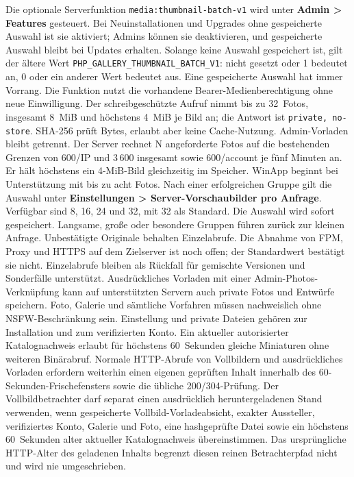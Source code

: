 \documentclass[11pt,a4paper]{article}
\newcommand{\ui}[1]{\textbf{#1}}
\newcommand{\codeword}[1]{\nolinkurl{#1}}
\begin{document}
Die optionale Serverfunktion \codeword{media:thumbnail-batch-v1} wird unter
\ui{Admin > Features} gesteuert. Bei Neuinstallationen und Upgrades ohne
gespeicherte Auswahl ist sie aktiviert; Admins können sie deaktivieren, und
gespeicherte Auswahl bleibt bei Updates erhalten. Solange keine Auswahl
gespeichert ist, gilt der ältere Wert
\codeword{PHP_GALLERY_THUMBNAIL_BATCH_V1}: nicht gesetzt oder 1 bedeutet an,
0 oder ein anderer Wert bedeutet aus. Eine gespeicherte Auswahl hat immer
Vorrang. Die Funktion nutzt die vorhandene
Bearer-Medienberechtigung ohne neue Einwilligung. Der schreibgeschützte Aufruf
nimmt bis zu 32~Fotos, insgesamt 8~MiB und höchstens 4~MiB je Bild an; die
Antwort ist \texttt{private, no-store}. SHA-256 prüft Bytes, erlaubt aber keine
Cache-Nutzung. Admin-Vorladen bleibt getrennt. Der Server rechnet N angeforderte
Fotos auf die bestehenden Grenzen von 600/IP und 3\,600 insgesamt sowie
600/account je fünf Minuten an. Er hält höchstens ein 4-MiB-Bild gleichzeitig
im Speicher. WinApp beginnt bei Unterstützung mit bis zu acht Fotos. Nach
einer erfolgreichen Gruppe gilt die Auswahl unter
\ui{Einstellungen > Server-Vorschaubilder pro Anfrage}. Verfügbar sind 8, 16,
24 und 32, mit 32 als Standard. Die Auswahl wird sofort gespeichert.
Langsame, große oder besondere Gruppen führen zurück zur kleinen Anfrage.
Unbestätigte Originale behalten Einzelabrufe.
Die Abnahme von FPM, Proxy und HTTPS auf dem Zielserver ist noch offen; der
Standardwert bestätigt sie nicht. Einzelabrufe bleiben als
Rückfall für gemischte Versionen und Sonderfälle unterstützt.
Ausdrückliches Vorladen mit einer Admin-Photos-Verknüpfung kann auf
unterstützten Servern auch private Fotos und Entwürfe speichern. Foto,
Galerie und sämtliche Vorfahren müssen nachweislich ohne NSFW-Beschränkung
sein. Einstellung und private Dateien gehören zur Installation und zum
verifizierten Konto. Ein aktueller autorisierter Katalognachweis erlaubt für
höchstens 60~Sekunden gleiche Miniaturen ohne weiteren Binärabruf. Normale
HTTP-Abrufe von Vollbildern und ausdrückliches Vorladen erfordern weiterhin
einen eigenen geprüften Inhalt innerhalb des 60-Sekunden-Frischefensters sowie
die übliche 200/304-Prüfung. Der Vollbildbetrachter darf separat einen
ausdrücklich heruntergeladenen Stand verwenden, wenn gespeicherte
Vollbild-Vorladeabsicht, exakter Aussteller, verifiziertes Konto, Galerie und
Foto, eine hashgeprüfte Datei sowie ein höchstens 60~Sekunden alter aktueller
Katalognachweis übereinstimmen. Das ursprüngliche HTTP-Alter des geladenen
Inhalts begrenzt diesen reinen Betrachterpfad nicht und wird nie umgeschrieben.
\end{document}
